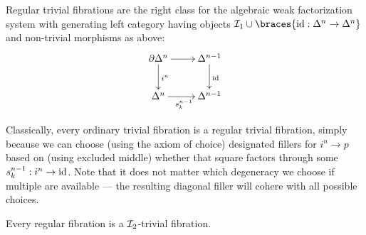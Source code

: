\documentclass[reqno,10pt,a4paper,oneside]{amsart}
\begin{document}
Regular trivial fibrations are the right class for the algebraic weak factorization system with generating left category having objects $\cal{I}_1 \cup \braces{\id : \Delta^n \to \Delta^n}$ and non-trivial morphisms as above:
\[
\xymatrix{
  \partial \Delta^n
  \ar[r]
  \ar[d]^{i^n}
&
  \Delta^{n-1}
  \ar[d]^{\id}
\\
  \Delta^n
  \ar[r]_{s_k^{n-1}}
&
  \Delta^{n-1}
}
\]

Classically, every ordinary trivial fibration is a regular trivial fibration, simply because we can choose (using the axiom of choice) designated fillers for $i^n \to p$ based on (using excluded middle) whether that square factors through some $s_k^{n-1} : i^n \to \id$.
Note that it does not matter which degeneracy we choose if multiple are available --- the resulting diagonal filler will cohere with all possible choices.

\begin{lemma}
Every regular fibration is a $\cal{I}_2$-trivial fibration.
\end{lemma}
\end{document}
